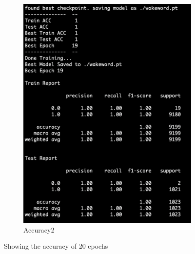 \documentclass[fleqn,10pt]{SelfArx} %
\begin{document}
\begin{figure}[h!]
\begin{subfigure}[b]{0.9\linewidth}
    \includegraphics[width=\linewidth]{2.png}
    \caption{Accuracy2}
  \end{subfigure}
  \caption{Showing the accuracy of 20 epochs}
  \label{fig:accuracy}
\end{figure}

\end{document}
